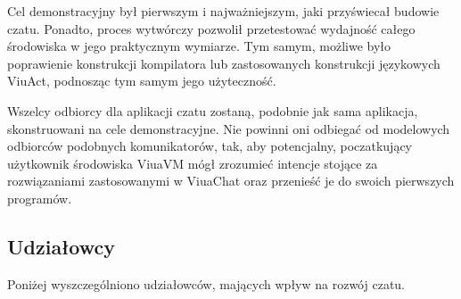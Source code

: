 Cel demonstracyjny był pierwszym i najważniejszym, jaki przyświecał budowie
czatu. Ponadto, proces wytwórczy pozwolił przetestować wydajność całego
środowiska w jego praktycznym wymiarze. Tym samym, możliwe było poprawienie
konstrukcji kompilatora lub zastosowanych konstrukcji językowych ViuAct,
podnosząc tym samym jego użyteczność.

Wszelcy odbiorcy dla aplikacji czatu zostaną, podobnie jak sama aplikacja,
skonstruowani na cele demonstracyjne. Nie powinni oni odbiegać od modelowych
odbiorców podobnych komunikatorów, tak, aby potencjalny, poczatkujący
użytkownik środowiska ViuaVM mógł zrozumieć intencje stojące za rozwiązaniami
zastosowanymi w ViuaChat oraz przenieść je do swoich pierwszych programów.

\subsection{Udziałowcy}

Poniżej wyszczególniono udziałowców, mających wpływ na rozwój czatu.

